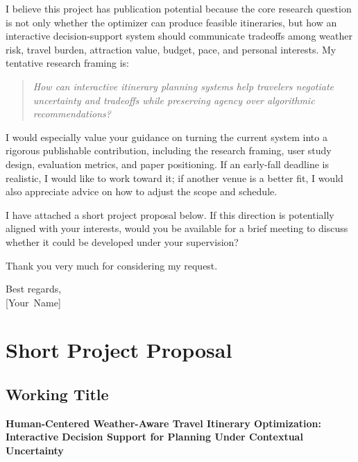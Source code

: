 \documentclass[11pt,a4paper]{article}
\begin{document}
I believe this project has publication potential because the core research question is not only whether the optimizer can produce feasible itineraries, but how an interactive decision-support system should communicate tradeoffs among weather risk, travel burden, attraction value, budget, pace, and personal interests. My tentative research framing is:

\begin{quote}
\emph{How can interactive itinerary planning systems help travelers negotiate uncertainty and tradeoffs while preserving agency over algorithmic recommendations?}
\end{quote}

\noindent I would especially value your guidance on turning the current system into a rigorous publishable contribution, including the research framing, user study design, evaluation metrics, and paper positioning. If an early-fall deadline is realistic, I would like to work toward it; if another venue is a better fit, I would also appreciate advice on how to adjust the scope and schedule.

\vspace{0.75em}

\noindent I have attached a short project proposal below. If this direction is potentially aligned with your interests, would you be available for a brief meeting to discuss whether it could be developed under your supervision?

\vspace{0.75em}

\noindent Thank you very much for considering my request.

\vspace{0.75em}

\noindent Best regards,\\
\mbox{[Your Name]}

\newpage

\section*{Short Project Proposal}

\subsection*{Working Title}

\noindent \textbf{Human-Centered Weather-Aware Travel Itinerary Optimization: Interactive Decision Support for Planning Under Contextual Uncertainty}
\end{document}
